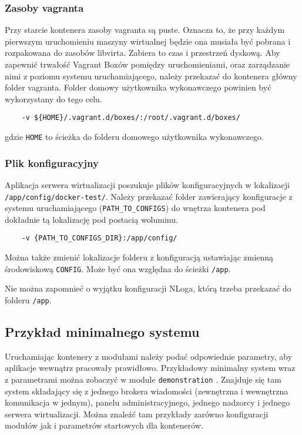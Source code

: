 \documentclass[../opis-rozwiazania.tex]{subfiles}
\begin{document}
\subsubsection{Zasoby vagranta}
Przy starcie kontenera zasoby vagranta są puste.
Oznacza to, że przy każdym pierwszym uruchomieniu maszyny wirtualnej będzie ona musiała być pobrana i rozpakowana do zasobów libvirta.
Zabiera to czas i przestrzeń dyskową.
Aby zapewnić trwałość Vagrant Boxów pomiędzy uruchomieniami, oraz zarządzanie nimi z poziomu systemu uruchamiającego, należy przekazać do kontenera główny folder vagranta.
Folder domowy użytkownika wykonawczego powinien być wykorzystany do tego celu.

\begin{verbatim}
	-v ${HOME}/.vagrant.d/boxes/:/root/.vagrant.d/boxes/
\end{verbatim}
gdzie \texttt{HOME} to ścieżka do folderu domowego użytkownika wykonawczego.

\subsubsection{Plik konfiguracyjny}
Aplikacja serwera wirtualizacji poszukuje plików konfiguracyjnych w lokalizacji \texttt{/app/config/docker-test/}.
Należy przekazać folder zawierający konfiguracje z systemu uruchamiającego (\texttt{PATH\_TO\_CONFIGS}) do wnętrza kontenera pod dokładnie tą lokalizację pod postacią woluminu.
\begin{verbatim}
	-v {PATH_TO_CONFIGS_DIR}:/app/config/
\end{verbatim}

Można także zmienić lokalizacje folderu z konfiguracją ustawiając zmienną środowiskową \texttt{CONFIG}.
Może być ona względna do ścieżki \texttt{/app}.

Nie można zapomnieć o wyjątku konfiguracji NLoga, którą trzeba przekazać do folderu \texttt{/app}.

\subsection{Przykład minimalnego systemu}
Uruchamiając kontenery z modułami należy podać odpowiednie parametry, aby aplikacje wewnątrz pracowały prawidłowo.
Przykładowy minimalny system wraz z parametrami można zobaczyć w module \texttt{demonstration} \parencite{ocd-demo}.
Znajduje się tam system składający się z jednego brokera wiadomości (zewnętrzna i wewnętrzna komunikacja w jednym), panelu administracyjnego, jednego nadzorcy i jednego serwera wirtualizacji.
Można znaleźć tam przykłady zarówno konfiguracji modułów jak i parametrów startowych dla kontenerów.
\end{document}
